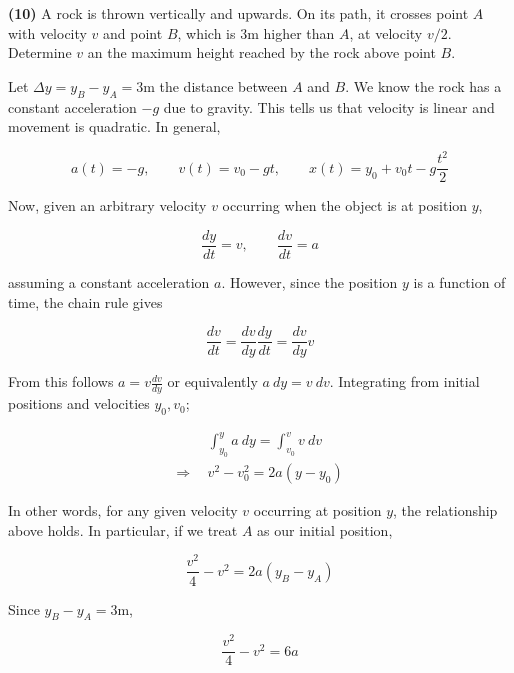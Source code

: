 \documentclass[12pt]{article}
\theoremstyle{definition}
\begin{document}
\pagebreak 

\begin{shaded}
    \textbf{(10)} A rock is thrown vertically and upwards. On its path, it
    crosses point $A$ with velocity $v$ and point $B$, which is $3$m higher than
    $A$, at velocity $v / 2$. Determine $v$ an the maximum height reached by the
    rock above point $B$.
\end{shaded}

Let $\Delta y = y_B - y_A = 3$m the distance between $A$ and $B$. We know the
rock has a constant acceleration $-g$ due to gravity. This tells us that
velocity is linear and movement is quadratic. In  general, 

\begin{equation*}
    a(t) = -g, \qquad v(t) = v_0 - gt, \qquad x(t) = y_0 + v_0 t - g\frac{t^2}{2}
\end{equation*}

Now, given an arbitrary velocity $v$ occurring when the object is at position
$y$,

\begin{equation*}
    \frac{dy}{dt} = v, \qquad \frac{dv}{dt} = a
\end{equation*}

assuming a constant acceleration $a$. However, since the position $y$ is a
function of time, the chain rule gives

\begin{equation*}
    \frac{dv}{dt} = \frac{dv}{dy} \frac{dy}{dt} = \frac{dv}{dy} v
\end{equation*}

From this follows $a = v \frac{dv}{dy}$ or equivalently $a ~ dy = v ~ dv$.
Integrating from initial positions and velocities $y_0, v_0$;

\begin{align*}
    &\int_{y_0}^y a ~ dy = \int_{v_0}^v v ~ dv 
    \\\Rightarrow ~ ~  &v^2 - v_0^2 = 2a(y -
    y_0)
\end{align*}

In other words, for any given velocity $v$ occurring at position $y$, the
relationship above holds. In particular, if we treat $A$ as our initial
position,

\begin{equation*}
    \frac{v^2}{4} - v^2 = 2a(y_B - y_A)
\end{equation*}

Since $y_B - y_A = 3$m,


\begin{equation*}
    \frac{v^2}{4} - v^2 = 6a
\end{equation*}
\end{document}
